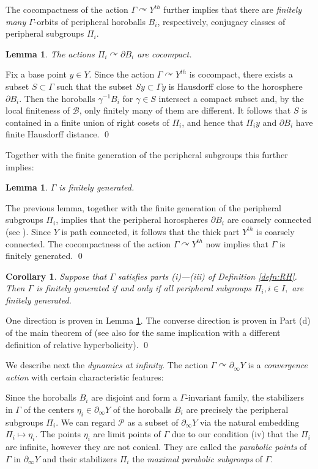 \documentclass[12pt]{article}
\theoremstyle{boldplain}
\newtheorem{cor}[equation]{Corollary}
\newtheorem{lem}[equation]{Lemma}
\theoremstyle{bolddefinition}
\numberwithin{equation}{section}
\def\ga{\gamma}
\def\Ga{\Gamma}
\def\acts{\curvearrowright}
\def\D{\partial}
\def\geo{\partial_{\infty}}
\begin{document}
The cocompactness of the action $\Ga\acts Y^{th}$ further implies 
that there are {\em finitely many} $\Ga$-orbits of peripheral horoballs $B_i$, respectively, 
conjugacy classes of peripheral subgroups $\Pi_i$.


\begin{lem}
\label{lem:prphsbgcchs}
The actions $\Pi_i\acts\D B_i$ are cocompact.
\end{lem}
\proof 
Fix a base point $y\in Y$.
Since the action $\Ga\acts Y^{th}$ is cocompact,
there exists a subset $S\subset\Ga$ such that the subset 
$Sy\subset\Ga y$ 
is Hausdorff close to the horosphere $\D B_i$.
Then the horoballs $\ga^{-1}B_i$ for $\ga\in S$ intersect a compact subset and,
by the local finiteness of ${\mathcal B}$, 
only finitely many of them are different. 
It follows that $S$ is contained in a finite union of right cosets of $\Pi_i$,
and hence that $\Pi_iy$ and $\D B_i$ have finite Hausdorff distance. 
\qed

\medskip
Together with the finite generation of the peripheral subgroups this further implies:
\begin{lem}\label{lem:RH->fg} 
$\Ga$ is finitely generated.
\end{lem}
\proof
The previous lemma,  together with the finite generation of the peripheral subgroups $\Pi_i$, implies 
that the peripheral horospheres $\D B_i$ are coarsely connected (see \cite{Drutu-Kapovich}). 
Since $Y$ is path connected, it follows that the thick part $Y^{th}$ is coarsely connected.
The cocompactness of the action $\Ga\acts Y^{th}$ now implies that $\Ga$ is finitely generated.
\qed

\begin{cor}
Suppose that $\Ga$ satisfies parts (i)---(iii) of Definition \ref{defn:RH}. Then 
$\Ga$ is finitely generated if and only if all peripheral subgroups $\Pi_i, i\in I,$ are finitely generated. 
\end{cor}
\proof One direction is proven in Lemma \ref{lem:RH->fg}. The converse direction is proven in Part (d) of the main theorem 
of \cite{Gerasimov} (see also \cite{Drutu-Sapir} for the same implication with a different definition of relative hyperbolicity). \qed 


\medskip
We describe next the {\em dynamics at infinity}.
The action $\Ga\acts\geo Y$ 
is a {\em convergence action} with certain characteristic features:

Since the horoballs $B_i$ are disjoint and form a $\Ga$-invariant family,
the stabilizers in $\Ga$ of the centers $\eta_i\in\geo Y$ of the horoballs $B_i$ are precisely the peripheral subgroups $\Pi_i$.
We can regard ${\mathcal P}$ as a subset of $\geo Y$
via the natural embedding $\Pi_i\mapsto\eta_i$.
The points $\eta_i$ are limit points of $\Ga$ 
due to our condition (iv) that the $\Pi_i$ are infinite,
however they are not conical.
They are called the {\em parabolic points} of $\Ga$ in $\geo Y$
and their stabilizers $\Pi_i$ the {\em maximal parabolic subgroups} of $\Ga$. 
\end{document}
